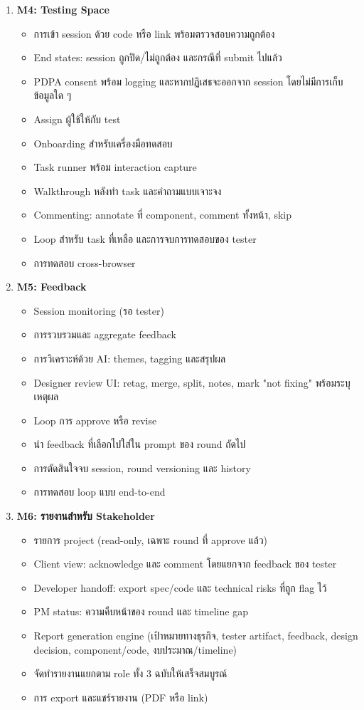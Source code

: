 \documentclass[a4paper,oneside]{cpe-thesis-th}
\begin{document}
\begin{enumerate}
  \item \textbf{M4: Testing Space}
    \begin{itemize}
      \item การเข้า session ด้วย code หรือ link พร้อมตรวจสอบความถูกต้อง
      \item End states: session ถูกปิด/ไม่ถูกต้อง และกรณีที่ submit ไปแล้ว
      \item PDPA consent พร้อม logging และหากปฏิเสธจะออกจาก session โดยไม่มีการเก็บข้อมูลใด ๆ
      \item Assign ผู้ใช้ให้กับ test
      \item Onboarding สำหรับเครื่องมือทดสอบ
      \item Task runner พร้อม interaction capture
      \item Walkthrough หลังทำ task และคำถามแบบเจาะจง
      \item Commenting: annotate ที่ component, comment ทั้งหน้า, skip
      \item Loop สำหรับ task ที่เหลือ และการจบการทดสอบของ tester
      \item การทดสอบ cross-browser
    \end{itemize}

  \item \textbf{M5: Feedback}
    \begin{itemize}
      \item Session monitoring (รอ tester)
      \item การรวบรวมและ aggregate feedback
      \item การวิเคราะห์ด้วย AI: themes, tagging และสรุปผล
      \item Designer review UI: retag, merge, split, notes, mark "not fixing" พร้อมระบุเหตุผล
      \item Loop การ approve หรือ revise
      \item นำ feedback ที่เลือกไปใส่ใน prompt ของ round ถัดไป
      \item การตัดสินใจจบ session, round versioning และ history
      \item การทดสอบ loop แบบ end-to-end
    \end{itemize}

  \item \textbf{M6: รายงานสำหรับ Stakeholder}
    \begin{itemize}
      \item รายการ project (read-only, เฉพาะ round ที่ approve แล้ว)
      \item Client view: acknowledge และ comment โดยแยกจาก feedback ของ tester
      \item Developer handoff: export spec/code และ technical risks ที่ถูก flag ไว้
      \item PM status: ความคืบหน้าของ round และ timeline gap
      \item Report generation engine (เป้าหมายทางธุรกิจ, tester artifact, feedback, design decision, component/code, งบประมาณ/timeline)
      \item จัดทำรายงานแยกตาม role ทั้ง 3 ฉบับให้เสร็จสมบูรณ์
      \item การ export และแชร์รายงาน (PDF หรือ link)
    \end{itemize}


\end{enumerate}
\end{document}
